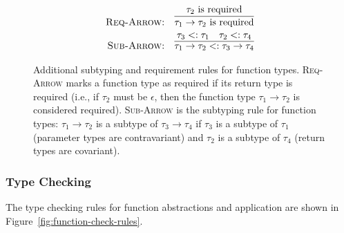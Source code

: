\documentclass[peerreview, 10pt]{IEEEtran}
\newcommand{\arrowt}[2]{\ensuremath{{#1}\rightarrow{#2}}}
\newcommand{\required}[1]{\ensuremath{#1\text{ is required}}}
\begin{document}
\begin{figure}[ht]
\centering
\begin{framed}
\begin{align*}
\text{\textsc{Req-Arrow:}} &\quad \infer{\required{\arrowt{\tau_1}{\tau_2}}}{\required{\tau_2}} \\
\text{\textsc{Sub-Arrow:}} &\quad \infer{\arrowt{\tau_1}{\tau_2} <: \arrowt{\tau_3}{\tau_4}}{\tau_3 <: \tau_1 \quad \tau_2 <: \tau_4}
\end{align*}
\end{framed}
\caption{Additional subtyping and requirement rules for function types. \textsc{Req-Arrow} marks a function type as required if its return type is required (i.e., if $\tau_2$ must be $\epsilon$, then the function type $\tau_1 \to \tau_2$ is considered required). \textsc{Sub-Arrow} is the subtyping rule for function types: $\tau_1 \to \tau_2$ is a subtype of $\tau_3 \to \tau_4$ if $\tau_3$ is a subtype of $\tau_1$ (parameter types are contravariant) and $\tau_2$ is a subtype of $\tau_4$ (return types are covariant).}
\label{fig:function-subtype-rules}
\end{figure}

\subsubsection{Type Checking}
The type checking rules for function abstractions and application are shown in Figure~\ref{fig:function-check-rules}.
\end{document}
